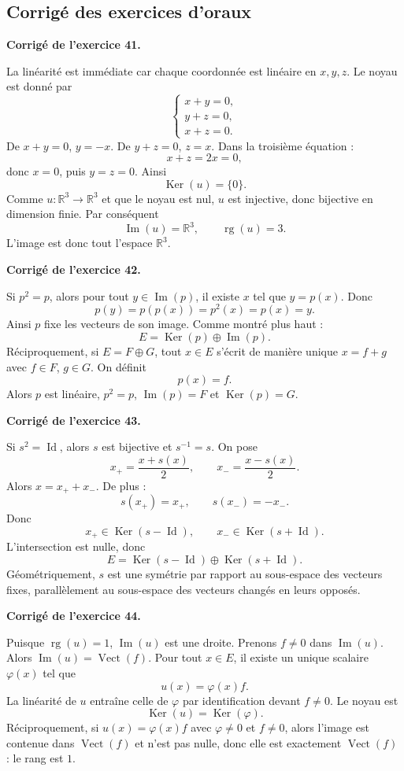 \documentclass[11pt,a4paper]{article}
\newcommand{\corr}[1]{
    \vspace{0.35cm}
    \noindent\textbf{\textcolor{blue!60!black}{Corrigé de l'exercice #1.}}
    \par
}
\newcommand{\Ker}{\operatorname{Ker}}
\newcommand{\Img}{\operatorname{Im}}
\newcommand{\rg}{\operatorname{rg}}
\newcommand{\Vect}{\operatorname{Vect}}
\newcommand{\Id}{\operatorname{Id}}
\begin{document}
\subsection{Corrigé des exercices d'oraux}

\corr{41}
La linéarité est immédiate car chaque coordonnée est linéaire en $x,y,z$.
Le noyau est donné par
\[
\begin{cases}
x+y=0,\\
y+z=0,\\
x+z=0.
\end{cases}
\]
De $x+y=0$, $y=-x$. De $y+z=0$, $z=x$. Dans la troisième équation :
\[
x+z=2x=0,
\]
donc $x=0$, puis $y=z=0$. Ainsi
\[
\Ker(u)=\{0\}.
\]
Comme $u:\mathbb{R}^3\to\mathbb{R}^3$ et que le noyau est nul, $u$ est injective, donc bijective en dimension finie. Par conséquent
\[
\Img(u)=\mathbb{R}^3,\qquad \rg(u)=3.
\]
L'image est donc tout l'espace $\mathbb{R}^3$.

\corr{42}
Si $p^2=p$, alors pour tout $y\in\Img(p)$, il existe $x$ tel que $y=p(x)$. Donc
\[
p(y)=p(p(x))=p^2(x)=p(x)=y.
\]
Ainsi $p$ fixe les vecteurs de son image.
Comme montré plus haut :
\[
E=\Ker(p)\oplus\Img(p).
\]
Réciproquement, si $E=F\oplus G$, tout $x\in E$ s'écrit de manière unique $x=f+g$ avec $f\in F$, $g\in G$. On définit
\[
p(x)=f.
\]
Alors $p$ est linéaire, $p^2=p$, $\Img(p)=F$ et $\Ker(p)=G$.

\corr{43}
Si $s^2=\Id$, alors $s$ est bijective et $s^{-1}=s$. On pose
\[
x_+=\frac{x+s(x)}2,\qquad x_-=\frac{x-s(x)}2.
\]
Alors $x=x_++x_-$. De plus :
\[
s(x_+)=x_+,\qquad s(x_-)=-x_-.
\]
Donc
\[
x_+\in\Ker(s-\Id),\qquad x_-\in\Ker(s+\Id).
\]
L'intersection est nulle, donc
\[
E=\Ker(s-\Id)\oplus\Ker(s+\Id).
\]
Géométriquement, $s$ est une symétrie par rapport au sous-espace des vecteurs fixes, parallèlement au sous-espace des vecteurs changés en leurs opposés.

\corr{44}
Puisque $\rg(u)=1$, $\Img(u)$ est une droite. Prenons $f\neq0$ dans $\Img(u)$. Alors $\Img(u)=\Vect(f)$. Pour tout $x\in E$, il existe un unique scalaire $\varphi(x)$ tel que
\[
u(x)=\varphi(x)f.
\]
La linéarité de $u$ entraîne celle de $\varphi$ par identification devant $f\neq0$. Le noyau est
\[
\Ker(u)=\Ker(\varphi).
\]
Réciproquement, si $u(x)=\varphi(x)f$ avec $\varphi\neq0$ et $f\neq0$, alors l'image est contenue dans $\Vect(f)$ et n'est pas nulle, donc elle est exactement $\Vect(f)$ : le rang est $1$.
\end{document}
